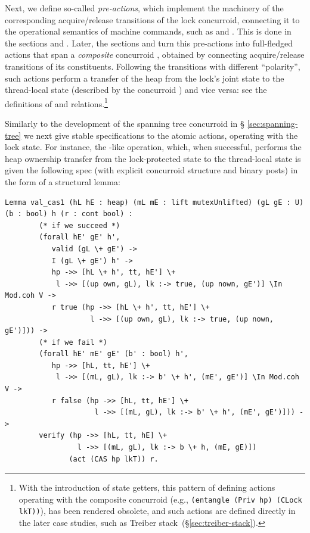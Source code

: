 Next, we define so-called \emph{pre-actions}, which implement the
machinery of the corresponding acquire/release transitions of the lock
concurroid, connecting it to the operational semantics of machine
commands, such as  and . This is done in the
sections  and . Later, the
sections  and  turn this pre-actions into
full-fledged actions that span a \emph{composite} concurroid
, obtained by connecting
acquire/release transitions of its constituents. Following the
transitions with different ``polarity'', such actions perform a
transfer of the heap from the lock's joint state to the thread-local
state (described by the concurroid ) and vice versa: see
the definitions of  and 
relations.\footnote{With the introduction of state getters, this
  pattern of defining actions operating with the composite concurroid
  (e.g., \texttt{(entangle (Priv hp) (CLock lkT))}), has been rendered
  obsolete, and such actions are defined directly in the later case
  studies, such as Treiber stack~(\S\ref{sec:treiber-stack}).}

Similarly to the development of the spanning tree concurroid in \S
\ref{sec:spanning-tree} we next give stable specifications to the
atomic actions, operating with the lock state. For instance, the
-like operation, which, when successful, performs the heap
ownership transfer from the lock-protected state to the thread-local
state is given the following spec (with explicit concurroid structure
and binary posts) in the form of a structural lemma:

\begin{lstlisting}
Lemma val_cas1 (hL hE : heap) (mL mE : lift mutexUnlifted) (gL gE : U) (b : bool) h (r : cont bool) : 
        (* if we succeed *)
        (forall hE' gE' h', 
           valid (gL \+ gE') ->
           I (gL \+ gE') h' ->
           hp ->> [hL \+ h', tt, hE'] \+ 
            l ->> [(up own, gL), lk :-> true, (up nown, gE')] \In Mod.coh V ->
           r true (hp ->> [hL \+ h', tt, hE'] \+ 
                    l ->> [(up own, gL), lk :-> true, (up nown, gE')])) ->
        (* if we fail *)
        (forall hE' mE' gE' (b' : bool) h', 
           hp ->> [hL, tt, hE'] \+ 
            l ->> [(mL, gL), lk :-> b' \+ h', (mE', gE')] \In Mod.coh V ->
           r false (hp ->> [hL, tt, hE'] \+ 
                     l ->> [(mL, gL), lk :-> b' \+ h', (mE', gE')])) ->
        verify (hp ->> [hL, tt, hE] \+ 
                 l ->> [(mL, gL), lk :-> b \+ h, (mE, gE)])
               (act (CAS hp lkT)) r.  
\end{lstlisting}

